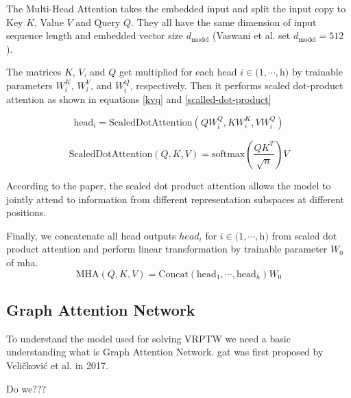             The Multi-Head Attention takes the embedded input and split the input copy to Key $K$, Value $V$ and Query $Q$. They all have the same dimension of input sequence length and embedded vector size $d_{\text{model}}$ (Vaswani et al. set $d_{\text{model}}=512$ \cite{attention-is-all}).
            
            The matrices $K$, $V$, and $Q$ get multiplied for each head $i \in (1, \cdots, $h$)$ by trainable parameters $W_i^K$, $W_i^V$, and $W_i^Q$, respectively. Then it performs scaled dot-product attention as shown in equations \ref{kvq} and \ref{scalled-dot-product}
            
            \begin{equation}\label{kvq}
                \text{head}_i = \text{ScaledDotAttention}(Q W_i^Q, K W_i^K, V W_i^Q)
            \end{equation}
            
            \begin{equation}\label{scalled-dot-product}
                \text{ScaledDotAttention}(Q, K, V) = \text{softmax}(\dfrac{Q K^T}{\sqrt{n}}) V
            \end{equation}
            
            According to the paper\cite{attention-is-all}, the scaled dot product attention allows the model to jointly attend to information from different representation subspaces at different positions.
            
            Finally, we concatenate all head outputs $head_i$ for $i \in (1, \cdots, $h$)$ from scaled dot product attention and perform linear transformation by trainable parameter $W_0$ of \gls{mha}.
            \begin{equation}
                \text{MHA}(Q, K, V) = \text{Concat}(\text{head}_1, \cdots, \text{head}_h)W_0
            \end{equation}
            
        \subsection{Graph Attention Network}\label{graph-attention-network}
        To understand the model used for solving \gls{VRPTW} we need a basic understanding what is Graph Attention Network.
        \gls{gat} was first proposed by Veličković et al. \cite{gat} in 2017.
        
        Do we???
    
    

